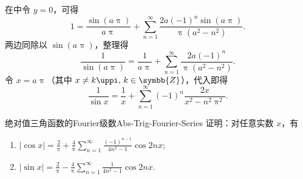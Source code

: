 \begin{myproof}

    在中令 $y = 0$，可得
    \begin{equation}\label{eq:sin-sub}
        1 = \frac{\sin(a\uppi)}{a\uppi} + \sum_{n=1}^{\infty} \frac{2a(-1)^n \sin(a\uppi)}{\uppi (a^2 - n^2)}.
    \end{equation}
    两边同除以 $\sin(a\uppi)$，整理得
    \begin{equation}\label{eq:csc-a}
        \frac{1}{\sin(a\uppi)} = \frac{1}{a\uppi} + \sum_{n=1}^{\infty} \frac{2a(-1)^n}{\uppi (a^2 - n^2)}.
    \end{equation}
    令 $x = a\uppi$（其中 $x \neq k\uppi, \, k \in \symbb{Z}$），代入即得
    \begin{equation}\label{eq:csc-result}
        \frac{1}{\sin x} = \frac{1}{x} + \sum_{n=1}^{\infty} (-1)^n \frac{2x}{x^2 - n^2 \uppi^2}.
    \end{equation}
\end{myproof}

\begin{problem}{绝对值三角函数的Fourier级数}{Abs-Trig-Fourier-Series}
    证明：对任意实数 $x$，有
    \begin{enumerate}
        \item $|\cos x| = \frac{2}{\uppi} + \frac{4}{\uppi} \sum_{n=1}^{\infty} \frac{(-1)^{n-1}}{4n^2 - 1} \cos 2nx$;
        \item $|\sin x| = \frac{2}{\uppi} - \frac{4}{\uppi} \sum_{n=1}^{\infty} \frac{1}{4n^2 - 1} \cos 2nx$.
    \end{enumerate}
\end{problem}

